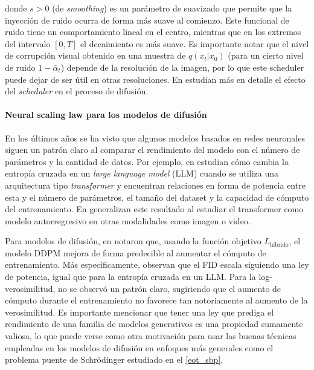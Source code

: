 donde $s>0$ (de \textit{smoothing}) es un parámetro de suavizado que permite que la inyección de ruido ocurra de forma más suave al comienzo. Este funcional de ruido tiene un comportamiento lineal en el centro, mientras que en los extremos del intervalo $[0,T]$ el decaimiento es más suave. Es importante notar que el nivel de corrupción visual obtenido en una muestra de $q(x_t|x_0)$ (para un cierto nivel de ruido $1-\bar\alpha_t$) depende de la resolución de la imagen, por lo que este scheduler puede dejar de ser útil en otras resoluciones. En \cite{chen2023importancenoiseschedulingdiffusion} estudian más en detalle el efecto del \textit{scheduler} en el proceso de difusión.

\paragraph{Neural scaling law para los modelos de difusión}

En los últimos años se ha visto que algunos modelos basados en redes neuronales siguen un patrón claro al comparar el rendimiento del modelo con el número de parámetros y la cantidad de datos. Por ejemplo, en \cite{kaplan2020scaling} estudian cómo cambia la entropía cruzada en un \textit{large language model} (LLM) cuando se utiliza una arquitectura tipo \textit{transformer} y encuentran relaciones en forma de potencia entre esta y el número de parámetros, el tamaño del dataset y la capacidad de cómputo del entrenamiento. En \cite{farhani2022momentum} generalizan este resultado al estudiar el transformer como modelo autorregresivo en otras modalidades como imagen o video.

Para modelos de difusión, en \cite{nichol2021improved} notaron que, usando la función objetivo $L_{\text{híbrido}}$, el modelo DDPM mejora de forma predecible al aumentar el cómputo de entrenamiento. Más específicamente, observan que el FID escala siguiendo una ley de potencia, igual que para la entropía cruzada en un LLM. Para la log-verosimilitud, no se observó un patrón claro, sugiriendo que el aumento de cómputo durante el entrenamiento no favorece tan notoriamente al aumento de la verosimilitud. Es importante mencionar que tener una ley que prediga el rendimiento de una familia de modelos generativos es una propiedad sumamente valiosa, lo que puede verse como otra motivación para usar las buenas técnicas empleadas en los modelos de difusión en enfoques más generales como el problema puente de Schrödinger estudiado en el \autoref{eot_sbp}.

